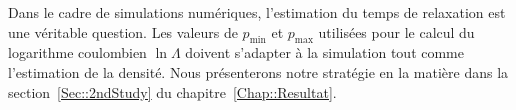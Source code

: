 Dans le cadre de simulations numériques, l'estimation du temps de relaxation est une véritable question. Les valeurs de $p_{\min}$ et $p_{\max}$
utilisées pour le calcul du logarithme coulombien $\ln \Lambda$ doivent s'adapter à la simulation tout comme l'estimation de la densité. Nous
présenterons notre stratégie en la matière dans la section~\ref{Sec::2ndStudy} du chapitre~\ref{Chap::Resultat}.
